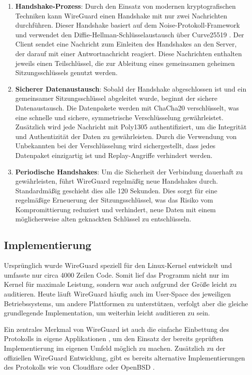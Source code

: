 \begin{enumerate}
    \item \textbf{Handshake-Prozess}: Durch den Einsatz von modernen kryptografischen Techniken kann WireGuard einen Handshake mit nur zwei Nachrichten durchführen. Dieser Handshake basiert auf dem Noise-Protokoll-Framework und verwendet den Diffie-Hellman-Schlüsselaustausch über Curve25519 \cite{Wireguard_Curve25519}. Der Client sendet eine Nachricht zum Einleiten des Handshakes an den Server, der darauf mit einer Antwortnachricht reagiert. Diese Nachrichten enthalten jeweils einen Teilschlüssel, die zur Ableitung eines gemeinsamen geheimen Sitzungsschlüssels genutzt werden.
    \item \textbf{Sicherer Datenaustausch}: Sobald der Handshake abgeschlossen ist und ein gemeinsamer Sitzungsschlüssel abgeleitet wurde, beginnt der sichere Datenaustausch. Die Datenpakete werden mit ChaCha20 \cite{Wireguard_ChaCha20} verschlüsselt, was eine schnelle und sichere, symmetrische Verschlüsselung gewährleistet. Zusätzlich wird jede Nachricht mit Poly1305 \cite{Wireguard_Poly1305} authentifiziert, um die Integrität und Authentizität der Daten zu gewährleisten. Durch die Verwendung von Unbekannten bei der Verschlüsselung wird sichergestellt, dass jedes Datenpaket einzigartig ist und Replay-Angriffe verhindert werden.
    \item \textbf{Periodische Handshakes}: Um die Sicherheit der Verbindung dauerhaft zu gewährleisten, führt WireGuard regelmäßig neue Handshakes durch. Standardmäßig geschieht dies alle 120 Sekunden. Dies sorgt für eine regelmäßige Erneuerung der Sitzungsschlüssel, was das Risiko vom Kompromittierung reduziert und verhindert, neue Daten mit einem möglicherweise alten geknackten Schlüssel zu entschlüsseln.
\end{enumerate}

\subsection{Implementierung}

Ursprünglich wurde WireGuard speziell für den Linux-Kernel entwickelt und umfasste nur circa 4000 Zeilen Code. Somit lief das Programm nicht nur im Kernel für maximale Leistung, sondern war auch aufgrund der Größe leicht zu auditieren. Heute läuft WireGuard häufig auch im User-Space des jeweiligen Betriebssystems, um andere Plattformen zu unterstützen, verfolgt aber die gleiche grundlegende Implementation, um weiterhin leicht auditieren zu sein. \cite{Wireguard_cross_platform}

Ein zentrales Merkmal von WireGuard ist auch die einfache Einbettung des Protokolls in eigene Applikationen \cite{Wireguard_Embedding}, um den Einsatz der bereits geprüften Implementierung im eigenen Umfeld möglich zu machen. Zusätzlich zu der offiziellen WireGuard Entwicklung, gibt es bereits alternative Implementierungen des Protokolls wie von Cloudflare \cite{CloudflareBoringTun} oder OpenBSD \cite{OpenBSD_WireGuard}.